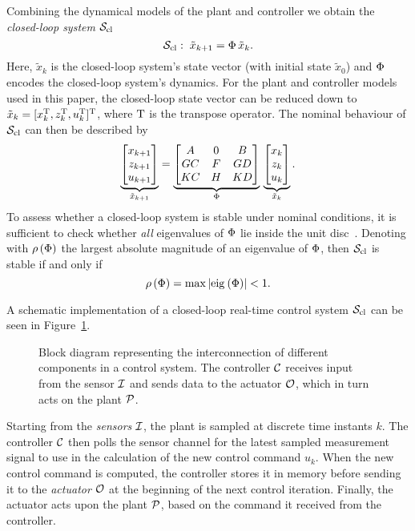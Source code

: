 Combining the dynamical models of the plant and controller we obtain the \emph{closed-loop system} $\mathcal{S}_{\text{cl}}$
%
\begin{equation}
    \label{eq:clsys}
    \clsys :\; \tilde x_{k+1} = \clmat \,\tilde x_{k}.
\end{equation}
%
Here, $\tilde x_{k}$ is the closed-loop system's state vector (with initial state $\tilde{x}_0$) and $\Phi$ encodes the closed-loop system's dynamics.
For the plant and controller models used in this paper, the closed-loop state vector can be reduced down to $\tilde x_{k} = [ x^{\mathrm{\small{T}}}_k, z^{\mathrm{\small{T}}}_k, u^{\mathrm{\small{T}}}_k ]^{\mathrm{\small{T}}}$, where $\mathrm{\small{T}}$ is the transpose operator.
The nominal behaviour of $\mathcal{S}_{\text{cl}}$ can then be described by
%
\begin{equation}
    \label{eq:nom}
    \underbrace{\begin{bmatrix}
        x_{k+1} \\
        z_{k+1} \\
        u_{k+1}
    \end{bmatrix}}_{\tilde x_{k+1}} = \underbrace{\begin{bmatrix}
        \Ap & 0 & \Bp \\
        \Bc\Cp & \Ac & \Bc\Dp \\
        \Dc\Cp & \Cc & \Dc\Dp
    \end{bmatrix}}_{\clmat} \, \underbrace{\begin{bmatrix}
        x_k \\
        z_k \\
        u_k
    \end{bmatrix}}_{\tilde x_k}.
\end{equation}
%
To assess whether a closed-loop system is stable under nominal conditions, it is sufficient to check whether \emph{all} eigenvalues of $\Phi$ lie inside the unit disc~\cite{Astrom:1997}.
Denoting with $\rho\left( \Phi \right)$ the largest absolute magnitude of an eigenvalue of $\Phi$, then $\mathcal{S}_{\text{cl}}$ is stable if and only if
%
\begin{equation}
    \label{eq:schur} 
    \rho\funof{\clmat} = \max{\abs{\eig{}{\clmat}}} < 1.
\end{equation}

A schematic implementation of a closed-loop real-time control system $\mathcal{S}_{\text{cl}}$ can be seen in Figure~\ref{fig:scheme}.
\begin{figure}[t]
    \centering
     
    \caption{Block diagram representing the interconnection of different components in a control system. The controller $\mathcal{C}$ receives input from the sensor $\mathcal{I}$ and sends data to the actuator $\mathcal{O}$, which in turn acts on the plant $\mathcal{P}$.}
    \label{fig:scheme}
\end{figure}
Starting from the \emph{sensors} $\mathcal{I}$, the plant is sampled at discrete time instants $k$.
The controller $\mathcal{C}$ then polls the sensor channel for the latest sampled measurement signal to use in the calculation of the new control command $u_k$.
When the new control command is computed, the controller stores it in memory before sending it to the \emph{actuator} $\mathcal{O}$ at the beginning of the next control iteration.
Finally, the actuator acts upon the plant $\mathcal{P}$, based on the command it received from the controller.

